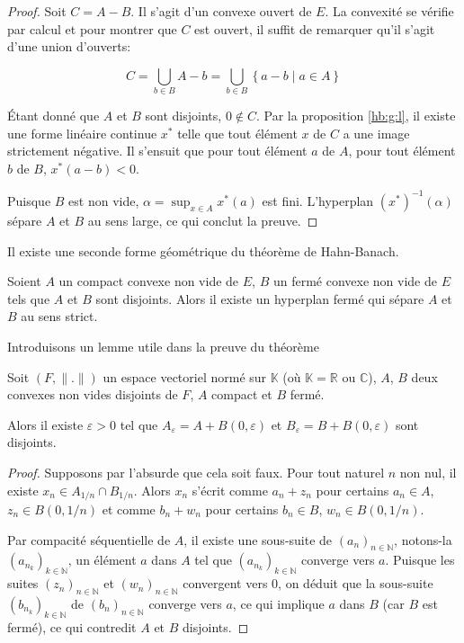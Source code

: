 \begin{proof}
  Soit $C = A - B $. Il s'agit d'un convexe ouvert de $E$. La convexité
  se vérifie par calcul et pour montrer que $C$ est ouvert,
  il suffit de remarquer qu'il s'agit d'une union d'ouverts:

  $$ C = \bigcup_{b\in B} A - b =
  \bigcup_{b\in B} \left\{a - b \mid a\in A\right\}$$

  \'{E}tant donné que $A$ et $B$ sont disjoints, $0\notin C$.
  Par la proposition \ref{hb:g:l}, il existe une forme linéaire
  continue $x^*$ telle que tout élément $x$ de $C$ a une image
  strictement négative. Il s'ensuit que pour tout élément $a$ de
  $A$, pour tout élément $b$ de $B$, $x^*(a - b) < 0$.

  Puisque $B$ est non vide, $\alpha = \sup_{x\in A}x^*(a)$ est fini. L'hyperplan
  $(x^*)^{-1}(\alpha)$ sépare $A$ et $B$ au sens large, ce qui conclut la preuve.
\end{proof}

Il existe une seconde forme géométrique du théorème de Hahn-Banach.

\begin{thm} \label{hb:g2}
  Soient $A$ un compact convexe non vide de $E$, $B$ un fermé convexe non vide
  de $E$ tels que $A$ et $B$ sont disjoints. Alors il existe un hyperplan
  fermé qui sépare $A$ et $B$ au sens strict.
\end{thm}

Introduisons un lemme utile dans la preuve du théorème

\begin{lem}\label{hb:g:l2}
  Soit $(F, \|.\|)$ un espace vectoriel normé sur $\mathbb{K}$ (où
  $\mathbb{K}= \mathbb{R}$ ou $\mathbb{C}$), $A$, $B$ deux convexes
  non vides disjoints de $F$, $A$ compact et $B$ fermé.

  Alors il existe $\varepsilon > 0$ tel que $A_\varepsilon =
  A + B(0, \varepsilon)$  et $B_\varepsilon = B
  + B(0, \varepsilon)$ sont disjoints.
\end{lem}
\begin{proof}
  Supposons par l'absurde que cela soit faux. Pour tout naturel $n$ non
  nul, il existe $x_n\in A_{1/n}\cap B_{1/n}$. Alors $x_n$ s'écrit comme
  $a_n + z_n$ pour certains $a_n\in A$, $z_n\in B(0, 1/n)$ et comme
  $b_n + w_n$ pour certains $b_n\in B$, $w_n\in B(0, 1/n)$.

  Par compacité séquentielle de $A$, il existe une sous-suite de
  $(a_n)_{n\in\mathbb{N}}$, notons-la $(a_{n_k})_{k\in\mathbb{N}}$, un élément
  $a$ dans $A$ tel que   $(a_{n_k})_{k\in\mathbb{N}}$ converge
  vers $a$. Puisque les suites $(z_n)_{n\in\mathbb{N}}$ et
  $(w_n)_{n\in\mathbb{N}}$ convergent vers $0$, on déduit que
  la sous-suite  $(b_{n_k})_{k\in\mathbb{N}}$ de
  $(b_{n})_{n\in\mathbb{N}}$ converge vers $a$, ce qui implique $a$
  dans $B$ (car $B$ est fermé), ce qui contredit $A$ et $B$ disjoints.
\end{proof}

